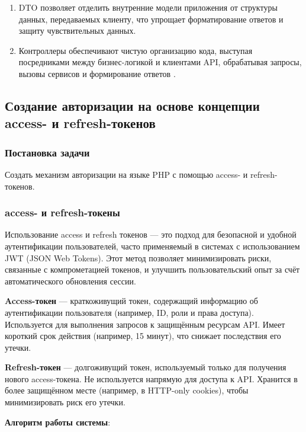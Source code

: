 \documentclass[pract]{SCWorks}
\begin{document}
\begin{enumerate}
    \item DTO позволяет отделить внутренние модели приложения от структуры 
    данных, передаваемых клиенту, что упрощает форматирование ответов и 
    защиту чувствительных данных.
    \item Контроллеры обеспечивают чистую организацию кода, выступая 
    посредниками между бизнес-логикой и клиентами API, обрабатывая запросы, 
    вызовы сервисов и формирование ответов 
    \cite{rest_api_tutorial, microsoft_rest_api, aws_rest_api}.
\end{enumerate}

\subsection{Создание авторизации на основе концепции access- и refresh-токенов}
\subsubsection{Постановка задачи}
Создать механизм авторизации на языке PHP с помощью access- и refresh-токенов.

\subsubsection{access- и refresh-токены}

Использование access и refresh токенов — это подход для безопасной и 
удобной аутентификации пользователей, часто применяемый в системах с 
использованием JWT (JSON Web Tokens). Этот метод позволяет минимизировать 
риски, связанные с компрометацией токенов, и улучшить пользовательский опыт 
за счёт автоматического обновления сессии.

\textbf{Access-токен} — краткоживущий токен, содержащий информацию об 
аутентификации пользователя (например, ID, роли и права доступа). Используется 
для выполнения запросов к защищённым ресурсам API. Имеет короткий срок действия
(например, 15 минут), что снижает последствия его утечки.

\textbf{Refresh-токен} — долгоживущий токен, используемый только для получения 
нового access-токена. Не используется напрямую для доступа к API. Хранится в 
более защищённом месте (например, в HTTP-only cookies), чтобы минимизировать 
риск его утечки.

\textbf{Алгоритм работы системы}:
\end{document}
